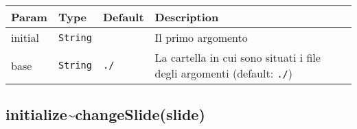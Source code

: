 \begin{longtabu} to \textwidth {X[1,L,m]X[1,L,m]X[1.5,L,m]X[1.5,L,m]}
\toprule
\begin{minipage}[b]{0.22\columnwidth}\raggedright
Param\strut
\end{minipage} & \begin{minipage}[b]{0.22\columnwidth}\raggedright
Type\strut
\end{minipage} & \begin{minipage}[b]{0.22\columnwidth}\raggedright
Default\strut
\end{minipage} & \begin{minipage}[b]{0.22\columnwidth}\raggedright
Description\strut
\end{minipage}\tabularnewline
\midrule
\endhead
\begin{minipage}[t]{0.22\columnwidth}\raggedright
initial\strut
\end{minipage} & \begin{minipage}[t]{0.22\columnwidth}\raggedright
\texttt{String}\strut
\end{minipage} & \begin{minipage}[t]{0.22\columnwidth}\raggedright
\strut
\end{minipage} & \begin{minipage}[t]{0.22\columnwidth}\raggedright
Il primo argomento\strut
\end{minipage}\tabularnewline
\begin{minipage}[t]{0.22\columnwidth}\raggedright
base\strut
\end{minipage} & \begin{minipage}[t]{0.22\columnwidth}\raggedright
\texttt{String}\strut
\end{minipage} & \begin{minipage}[t]{0.22\columnwidth}\raggedright
\texttt{./}\strut
\end{minipage} & \begin{minipage}[t]{0.22\columnwidth}\raggedright
La cartella in cui sono situati i file degli argomenti (default:
\texttt{./})\strut
\end{minipage}\tabularnewline
\bottomrule
\end{longtabu}

\protect\hypertarget{initialize..changeSlide}{}{}

\hypertarget{initializechangeslideslide}{%
\subsection{initialize\textasciitilde{}changeSlide(slide)}\label{initializechangeslideslide}}

